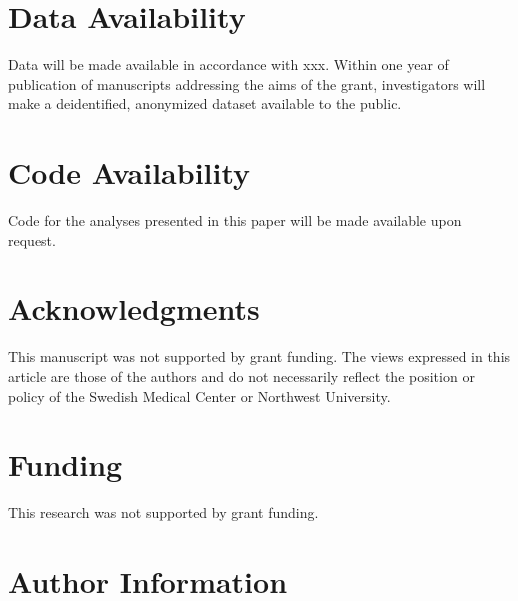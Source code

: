 \documentclass[
  letterpaper,
  DIV=11,
  numbers=noendperiod]{scrreport}
\begin{document}

\hypertarget{data-availability}{%
\chapter*{Data Availability}\label{data-availability}}

Data will be made available in accordance with xxx. Within one year of
publication of manuscripts addressing the aims of the grant,
investigators will make a deidentified, anonymized dataset available to
the public.


\hypertarget{code-availability}{%
\chapter*{Code Availability}\label{code-availability}}

Code for the analyses presented in this paper will be made available
upon request.


\hypertarget{acknowledgments}{%
\chapter*{Acknowledgments}\label{acknowledgments}}

This manuscript was not supported by grant funding. The views expressed
in this article are those of the authors and do not necessarily reflect
the position or policy of the Swedish Medical Center or Northwest
University.


\hypertarget{funding}{%
\chapter*{Funding}\label{funding}}

This research was not supported by grant funding.


\hypertarget{author-information}{%
\chapter*{Author Information}\label{author-information}}
\end{document}
